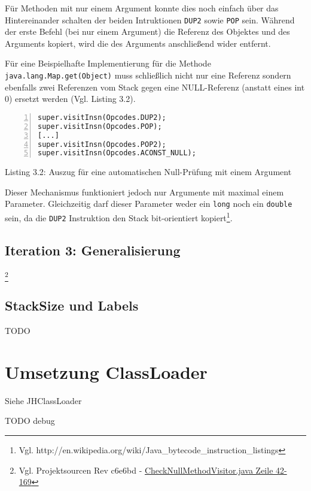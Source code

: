 Für Methoden mit nur einem Argument konnte dies noch einfach über das Hintereinander
schalten der beiden Intruktionen \texttt{DUP2} sowie \texttt{POP} sein.
Während der erste Befehl (bei nur einem Argument) die Referenz des Objektes und des Arguments
kopiert, wird die des Arguments anschließend wider entfernt.

Für eine Beispielhafte Implementierung für die Methode \texttt{java.lang.Map.get(Object)}
muss schließlich nicht nur eine Referenz sondern ebenfalls zwei Referenzen vom
Stack gegen eine NULL-Referenz (anstatt eines int 0) ersetzt werden (Vgl. Listing 3.2).

\begin{lstlisting}[basicstyle=\ttfamily,numbers=left,numberstyle=\footnotesize\ttfamily,backgroundcolor=\color{source}]
super.visitInsn(Opcodes.DUP2);
super.visitInsn(Opcodes.POP);
[...]
super.visitInsn(Opcodes.POP2);
super.visitInsn(Opcodes.ACONST_NULL);
\end{lstlisting}
\centerline{Listing 3.2: Auszug für eine automatischen Null-Prüfung mit einem Argument}

\vspace{0.3cm}

Dieser Mechanismus funktioniert jedoch nur Argumente mit maximal einem Parameter.
Gleichzeitig darf dieser Parameter weder ein \texttt{long} noch ein \texttt{double} sein,
da die \texttt{DUP2} Instruktion den Stack bit-orientiert kopiert\footnote{Vgl. http://en.wikipedia.org/wiki/Java\_bytecode\_instruction\_listings}.

\subsection{Iteration 3: Generalisierung}

\footnote{Vgl. Projektsourcen Rev c6e6bd - \href{https://github.com/jerolimov/java-hardener/blob/c6e6bdc7d081eae5e47d2c926073aa3715d908f6/src/main/java/de/fhkoeln/gm/cui/javahardener/CheckNullMethodVisitor.java\#L42-169}{CheckNullMethodVisitor.java Zeile 42-169}}

\subsection{StackSize und Labels}

TODO

\section{Umsetzung ClassLoader}

Siehe JHClassLoader

TODO debug

